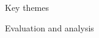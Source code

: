 \documentclass[review]{cmpreport}
\begin{document}
\begin{section}{Key themes}
\end{section}





\begin{section}{Evaluation and analysis}
\end{section}



\end{document}
